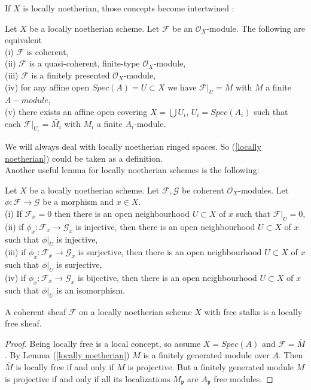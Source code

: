 \documentclass[
	oldfontcommands,
	sumario=abnt-6027-2012,
	12pt,			%
	openright,		%
	oneside,		%
	a4paper,		%
	english,		%
	brazil			%
	]{imecc-unicamp}
\begin{document}
If $X$ is locally noetherian, those concepts become intertwined :
\begin{lemma}\cite[Stacks, 29.9.1]{stacks-project}\label{locally noetherian}
Let $X$ be a locally noetherian scheme. Let $\mathcal{F}$ be an $\mathcal{O}_X$-module. The following are equivalent \\
(i) $\mathcal{F}$ is coherent, \\
(ii) $\mathcal{F}$ is a quasi-coherent, finite-type $\mathcal{O}_X$-module, \\
(iii) $\mathcal{F}$ is a finitely presented $\mathcal{O}_X$-module, \\
(iv) for any affine open $Spec(A)=U \subset X$ we have $\mathcal{F}|_U = \bar{M}$ with $M$ a finite $A-module$, \\
(v) there exists an affine open covering $X= \bigcup U_i$, $U_i = Spec(A_i)$ such that each $\mathcal{F}|_{U_i}=\bar{M_i}$ with $M_i$ a finite $A_i$-module.
\end{lemma}
We will always deal with locally noetherian ringed spaces. So (\ref{locally noetherian}) could be taken as a definition. \\
Another useful lemma for locally noetherian schemes is the following:
\begin{lemma}\cite[Stacks, 29.9.5]{stacks-project}\label{locally noetherian 2}
Let $X$ be a locally noetherian scheme. Let $\mathcal{F}, \mathcal{G}$ be coherent $\mathcal{O}_X$-modules. Let $\phi : \mathcal{F} \to \mathcal{G}$ be a morphism and $x \in X$. \\
(i) If $\mathcal{F}_x=0$ then there is an open neighbourhood $U \subset X$ of $x$ such that $\mathcal{F}|_U=0$, \\
(ii) if $\phi_x:\mathcal{F}_x \to \mathcal{G}_x$ is injective, then there is an open neighbourhood $U \subset X$ of $x$ such that $\phi|_U$ is injective, \\
(iii) if $\phi_x:\mathcal{F}_x \to \mathcal{G}_x$ is surjective, then there is an open neighbourhood $U \subset X$ of $x$ such that $\phi|_U$ is surjective, \\
(iv) if $\phi_x : \mathcal{F}_x \to \mathcal{G}_x$ is bijective, then there is an open neighbourhood $U \subset X$ of $x$ such that $\phi|_U$ is an isomorphism.
\end{lemma}
\begin{lemma}\label{coerente livre}
A coherent sheaf $\mathcal{F}$ on a locally noetherian scheme $X$ with free stalks is a locally free sheaf.
\end{lemma}
\begin{proof}
Being locally free is a local concept, so assume $X=Spec(A)$ and $\mathcal{F}=\bar{M}$. By Lemma (\ref{locally noetherian}) $M$ is a finitely generated module over $A$. Then $\bar{M}$ is locally free if and only if $M$ is projective. But a finitely generated module $M$ is projective if and only if all its localizations $M_\mathfrak{p}$ are $A_\mathfrak{p}$ free modules.
\end{proof}
\end{document}

